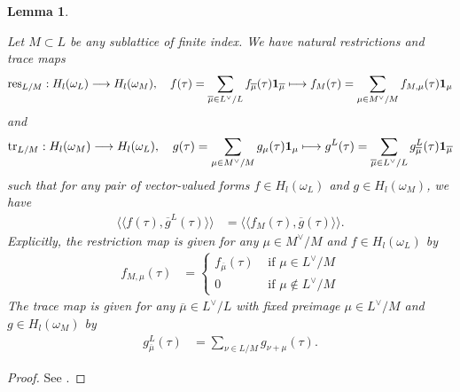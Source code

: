 \documentclass{amsart}
\newtheorem{lemma}[theorem]{Lemma}
\theoremstyle{definition}
\theoremstyle{definition}
\theoremstyle{definition}
\begin{document}
\begin{lemma}\label{lattice} 

Let $M \subset L$ be any sublattice of finite index. We have natural restrictions and trace maps 
\begin{align*} \operatorname{res}_{L/M} : H_l(\omega_L) \longrightarrow H_l(\omega_M), 
\quad f(\tau) = \sum\limits_{\overline{\mu} \in L^{\vee}/L} f_{\overline{\mu}}(\tau) {\bf{1}}_{\overline{\mu}} 
\longmapsto f_M (\tau) = \sum\limits_{\mu \in M^{\vee}/M} f_{M, \mu} (\tau) {\bf{1}}_{\mu} \end{align*} 
and 
\begin{align*} \operatorname{tr}_{L/M} : H_l(\omega_M) \longrightarrow H_l(\omega_L), 
\quad g (\tau) = \sum\limits_{\mu \in M^{\vee}/M} g_{\mu} (\tau) {\bf{1}}_{\mu} 
\longmapsto g^L (\tau) = \sum\limits_{\overline{\mu} \in L^{\vee}/L} g^L_{\overline{\mu}}(\tau) {\bf{1}}_{\overline{\mu}} \end{align*}
such that for any pair of vector-valued forms $f \in H_l(\omega_L)$ and $g \in H_l(\omega_M)$, we have 
\begin{align*} \langle \langle f(\tau), \overline{g}^L(\tau) \rangle \rangle &= \langle \langle f_M(\tau), \overline{g}(\tau) \rangle \rangle. \end{align*}
Explicitly, the restriction map is given for any $\mu \in M^{\vee}/M$ and $f \in H_l(\omega_L)$ by
\begin{align*} f_{M, \mu}(\tau) &= \begin{cases} f_{\overline{\mu}}(\tau)
&\text{ if $\mu \in L^{\vee}/M$} \\ 0 & \text{ if $\mu \notin L^{\vee}/M$} \end{cases} \end{align*}
The trace map is given for any $\overline{\mu} \in L^{\vee}/L$ with fixed preimage $\mu \in L^{\vee}/M$ and $g \in H_l(\omega_M)$ by 
\begin{align*} g^L_{\overline{\mu}}(\tau) &= \sum\limits_{\nu \in L/M} g_{\nu + \mu}(\tau). \end{align*} \end{lemma}

\begin{proof} See \cite[Lemma 3.1]{BY}. \end{proof}
\end{document}
